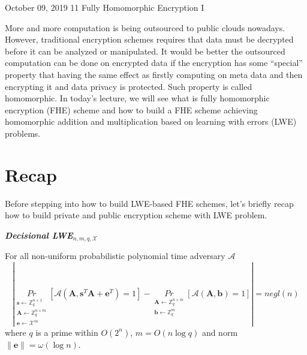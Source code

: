 \documentclass[usletter]{article}
\begin{document}
           {October 09, 2019}                          %
           {11}                                       %
           {Fully Homomorphic Encryption I}  %

\newcommand{\floor}[1]{\left\lfloor #1 \right\rfloor}
\newcommand{\ceil}[1]{\left\lceil #1 \right\rceil}

More and more computation is being outsourced to public clouds nowadays. However, traditional encryption schemes requires that data must be decrypted before it can be analyzed or manipulated. It would be better the outsourced computation can be done on encrypted data if the encryption has some ``special'' property that having the same effect as firstly computing on meta data and then encrypting it and data privacy is protected. Such property is called homomorphic. In today's lecture, we will see what is fully homomorphic encryption (FHE) scheme and how to build a FHE scheme achieving homomorphic addition and multiplication based on learning with errors (LWE) problems. 
           
\section{Recap}

Before stepping into how to build LWE-based FHE schemes, let's briefly recap how to build private and public encryption scheme with LWE problem.

\begin{definition}
\textbf{\textit{Decisional LWE$_{n,m,q,\mathcal{X}}$}}

For all non-uniform probabilistic polynomial time adversary $\mathcal{A}$
$$|\underset{\substack{
\pmb{s}\leftarrow \mathbb{Z}_q^{n\times1}\\
\pmb{A}\leftarrow\mathbb{Z}_q^{n\times m}\\
\pmb{e}\leftarrow \mathcal{X}^m}}{Pr}
[\mathcal{A}(\pmb{A},\pmb{s}^T\pmb{A}+\pmb{e}^T)=1]
-\underset{\substack{\pmb{A}\leftarrow\mathbb{Z}_q^{n\times m}\\
\pmb{b}\leftarrow\mathbb{Z}_q^m}}{Pr} 
[\mathcal{A}(\pmb{A},\pmb{b})=1]|=negl(n)$$
where $q$ is a prime within $O(2^n)$, $m=O(n\log q)$ and norm $\parallel \pmb{e}\parallel=\omega(\log n)$.
\end{definition}
\end{document}
